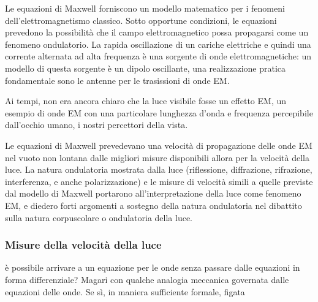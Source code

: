 \documentclass[letterpaper,10pt,italian]{jupyterBook}
\begin{document}
\sphinxAtStartPar
{} Le equazioni di Maxwell forniscono un modello matematico per i fenomeni dell’elettromagnetismo classico. Sotto opportune condizioni, le equazioni prevedono la possibilità che il campo elettromagnetico possa propagarsi come un fenomeno ondulatorio. La rapida oscillazione di un cariche elettriche \sphinxhyphen{} e quindi una corrente alternata ad alta frequenza \sphinxhyphen{} è una sorgente di onde elettromagnetiche: un modello di questa sorgente è un dipolo oscillante, una realizzazione pratica fondamentale sono le antenne per le trasissioni di onde EM.

\sphinxAtStartPar
Ai tempi, non era ancora chiaro che la luce visibile fosse un effetto EM, un esempio di onde EM con una particolare lunghezza d’onda e frequenza percepibile dall’occhio umano, i nostri percettori della vista.

\sphinxAtStartPar
Le equazioni di Maxwell prevedevano una velocità di propagazione delle onde EM nel vuoto non lontana dalle migliori misure disponibili allora per la velocità della luce. La natura ondulatoria mostrata dalla luce (riflessione, diffrazione, rifrazione, interferenza, e anche polarizzazione) e le misure di velocità simili a quelle previste dal modello di Maxwell portarono all’interpretazione della luce come fenomeno EM, e diedero forti argomenti a sostegno della natura ondulatoria nel dibattito sulla natura corpuscolare o ondulatoria della luce.
\subsubsection*{Misure della velocità della luce}

\sphinxAtStartPar
{}

\sphinxAtStartPar
{} è possibile arrivare a un equazione per le onde senza passare dalle equazioni in forma differenziale? Magari con qualche analogia meccanica governata dalle equazioni delle onde. Se sì, in maniera sufficiente formale, figata
\end{document}
